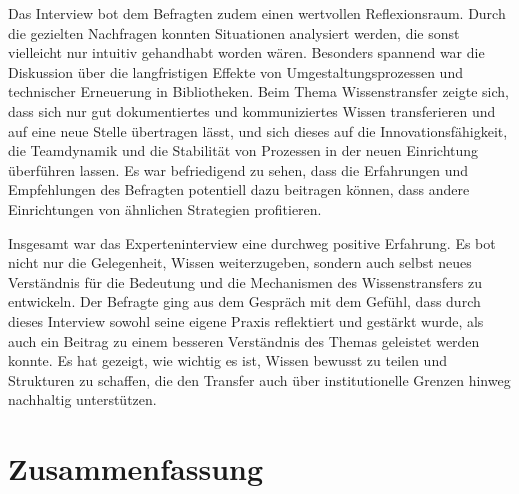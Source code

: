\documentclass[a4paper,
fontsize=11pt,
oneside,
numbers=noperiodatend,
parskip=half-,
bibliography=totoc,
final
]{scrartcl}
\begin{document}
Das Interview bot dem Befragten zudem einen wertvollen Reflexionsraum.
Durch die gezielten Nachfragen konnten Situationen analysiert werden,
die sonst vielleicht nur intuitiv gehandhabt worden wären. Besonders
spannend war die Diskussion über die langfristigen Effekte von
Umgestaltungsprozessen und technischer Erneuerung in Bibliotheken. Beim
Thema Wissenstransfer zeigte sich, dass sich nur gut dokumentiertes und
kommuniziertes Wissen transferieren und auf eine neue Stelle übertragen
lässt, und sich dieses auf die Innovationsfähigkeit, die Teamdynamik und
die Stabilität von Prozessen in der neuen Einrichtung überführen lassen.
Es war befriedigend zu sehen, dass die Erfahrungen und Empfehlungen des
Befragten potentiell dazu beitragen können, dass andere Einrichtungen
von ähnlichen Strategien profitieren.

Insgesamt war das Experteninterview eine durchweg positive Erfahrung. Es
bot nicht nur die Gelegenheit, Wissen weiterzugeben, sondern auch selbst
neues Verständnis für die Bedeutung und die Mechanismen des
Wissenstransfers zu entwickeln. Der Befragte ging aus dem Gespräch mit
dem Gefühl, dass durch dieses Interview sowohl seine eigene Praxis
reflektiert und gestärkt wurde, als auch ein Beitrag zu einem besseren
Verständnis des Themas geleistet werden konnte. Es hat gezeigt, wie
wichtig es ist, Wissen bewusst zu teilen und Strukturen zu schaffen, die
den Transfer auch über institutionelle Grenzen hinweg nachhaltig
unterstützen.

\section{Zusammenfassung}\label{zusammenfassung}
\end{document}
